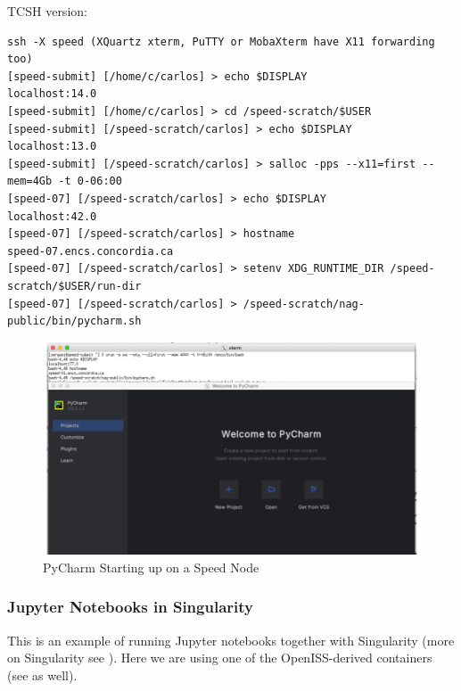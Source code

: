 TCSH version:
\scriptsize
\begin{verbatim}
ssh -X speed (XQuartz xterm, PuTTY or MobaXterm have X11 forwarding too)
[speed-submit] [/home/c/carlos] > echo $DISPLAY
localhost:14.0
[speed-submit] [/home/c/carlos] > cd /speed-scratch/$USER
[speed-submit] [/speed-scratch/carlos] > echo $DISPLAY
localhost:13.0
[speed-submit] [/speed-scratch/carlos] > salloc -pps --x11=first --mem=4Gb -t 0-06:00
[speed-07] [/speed-scratch/carlos] > echo $DISPLAY
localhost:42.0
[speed-07] [/speed-scratch/carlos] > hostname
speed-07.encs.concordia.ca
[speed-07] [/speed-scratch/carlos] > setenv XDG_RUNTIME_DIR /speed-scratch/$USER/run-dir
[speed-07] [/speed-scratch/carlos] > /speed-scratch/nag-public/bin/pycharm.sh
\end{verbatim}
\normalsize


\begin{figure}[htpb]
			\includegraphics[width=\columnwidth]{images/pycharm}
		\caption{PyCharm Starting up on a Speed Node}
	\label{fig:pycharm}
\end{figure}

\subsubsection{Jupyter Notebooks in Singularity}
\label{sect:jupyter}

This is an example of running Jupyter notebooks together with Singularity
(more on Singularity see ).
Here we are using one of the OpenISS-derived containers (see  as well).

